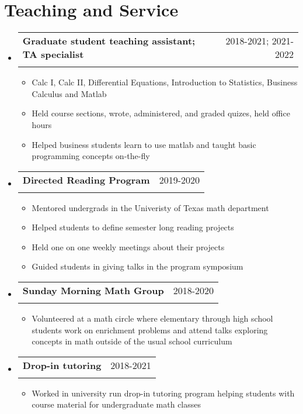 \documentclass[letterpaper,11pt]{article}
\makeatletter
\newcommand{\resumeItem}[1]{
  \item{
    {#1 \vspace{-4pt}}
  }
}
\newcommand{\resumeSubheading}[4]{
  \vspace{-2pt}\item
    \begin{tabular*}{0.97\textwidth}[t]{l@{\extracolsep{\fill}}r}
      \textbf{#1} & #2 \\
      \textit{\small #3} & \textit{\small #4} \\
    \end{tabular*}\vspace{-10pt}
}
\newcommand{\resumeSubHeadingListStart}{\begin{itemize}[leftmargin=0.15in, label={}]}
\newcommand{\resumeSubHeadingListEnd}{\end{itemize}}
\newcommand{\resumeItemListStart}{\begin{itemize}}
\newcommand{\resumeItemListEnd}{\end{itemize}\vspace{-2pt}}
\makeatother
\begin{document}
\section{Teaching and Service}
\resumeSubHeadingListStart
  \resumeSubheading{Graduate student teaching assistant; TA specialist}
                   {2018-2021; 2021-2022}
                   {}{}\vspace{-2ex}
    \resumeItemListStart\small
      \resumeItem{Calc I, 
                  Calc II, 
                  Differential Equations, 
                  Introduction to Statistics, 
                  Business Calculus and Matlab}
      \resumeItem{Held course sections, 
                  wrote, administered, and graded quizes, 
                  held office hours}
      \resumeItem{Helped business students learn to use matlab and taught basic programming 
                  concepts on-the-fly}
    \resumeItemListEnd
  \resumeSubheading{Directed Reading Program}{2019-2020}{}{}\vspace{-2ex}
    \resumeItemListStart\small
      \resumeItem{Mentored undergrads in the Univeristy of Texas math department}
      \resumeItem{Helped students to define semester long reading projects}
      \resumeItem{Held one on one weekly meetings about their projects}
      \resumeItem{Guided students in giving talks in the program symposium}
    \resumeItemListEnd
  \resumeSubheading{Sunday Morning Math Group}{2018-2020}{}{}\vspace{-2ex}
    \resumeItemListStart\small
      \resumeItem{Volunteered at a math circle where elementary through high school 
                 students work on enrichment problems and attend talks exploring 
                 concepts in math outside of the usual school curriculum}
    \resumeItemListEnd
  \resumeSubheading{Drop-in tutoring}{2018-2021}{}{}\vspace{-2ex}
    \resumeItemListStart\small
      \resumeItem{Worked in university run drop-in tutoring program helping students 
                  with course material for undergraduate math classes}
    \resumeItemListEnd
\resumeSubHeadingListEnd
\end{document}
